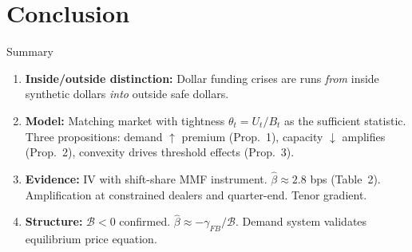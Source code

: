 \documentclass[aspectratio=169, 10pt]{beamer}
\newcommand{\calB}{\mathcal{B}}      %
\newcommand{\thetaT}{\theta_t}       %
\newcommand{\Bt}{B_t}                %
\newcommand{\Ut}{U_t}                %
\begin{document}
\section{Conclusion}

\begin{frame}{Summary}

  \begin{enumerate}
    \item \textbf{Inside/outside distinction:} Dollar funding crises are runs \emph{from}
          inside synthetic dollars \emph{into} outside safe dollars.

    \bigskip

    \item \textbf{Model:} Matching market with tightness $\thetaT = \Ut/\Bt$ as the
          sufficient statistic. Three propositions: demand $\uparrow$ premium (Prop.~1),
          capacity $\downarrow$ amplifies (Prop.~2), convexity drives threshold effects (Prop.~3).

    \bigskip

    \item \textbf{Evidence:} IV with shift-share MMF instrument.
          $\hat\beta \approx 2.8$ bps (Table~2). Amplification at constrained dealers
          and quarter-end. Tenor gradient.

    \bigskip

    \item \textbf{Structure:} $\calB < 0$ confirmed. $\hat\beta \approx -\gamma_{FB}/\calB$.
          Demand system validates equilibrium price equation.
  \end{enumerate}

\end{frame}
\end{document}
